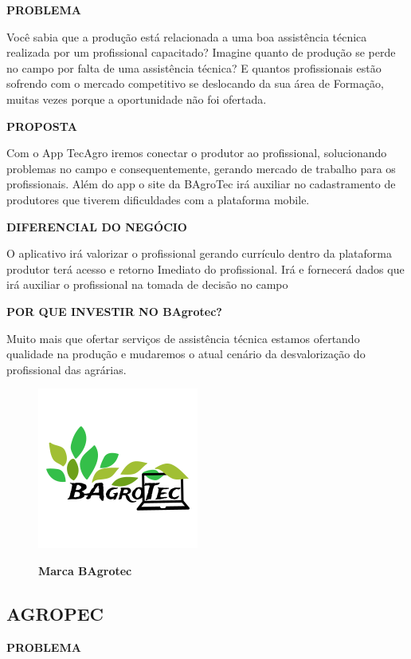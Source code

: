 \textbf{PROBLEMA}

Você sabia que a produção está relacionada a uma boa assistência técnica realizada por um profissional capacitado? Imagine quanto de produção se perde no campo por falta de uma assistência técnica? E quantos profissionais estão sofrendo com o mercado competitivo se deslocando da sua área de Formação, muitas vezes porque a oportunidade não foi ofertada. 

\textbf{PROPOSTA}

Com o App TecAgro iremos conectar o produtor ao profissional, solucionando problemas no campo e consequentemente, gerando mercado de trabalho para os profissionais. Além do app o site da BAgroTec irá auxiliar no cadastramento de produtores que tiverem dificuldades com a plataforma mobile.  

\textbf{DIFERENCIAL DO NEGÓCIO}

O aplicativo irá valorizar o profissional gerando currículo dentro da plataforma  produtor terá acesso e retorno Imediato do profissional. Irá e fornecerá dados que irá auxiliar o profissional na tomada de decisão no campo

\textbf{POR QUE INVESTIR NO BAgrotec?}

Muito mais que ofertar serviços de assistência técnica estamos ofertando qualidade na produção e mudaremos o atual cenário da desvalorização do profissional das agrárias.

\begin{figure}[!htb]
\centering
\caption{\textbf{Marca BAgrotec}}
\includegraphics[scale=1.0]{Imagens/bagrotec.png}
\label{figura_15}
\end{figure}
\newpage


\subsection{AGROPEC}


\textbf{PROBLEMA}

